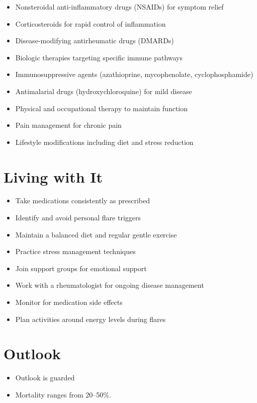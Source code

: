 \begin{itemize}[noitemsep]
  \item Nonsteroidal anti-inflammatory drugs (NSAIDs) for symptom relief
  \item Corticosteroids for rapid control of inflammation
  \item Disease-modifying antirheumatic drugs (DMARDs)
  \item Biologic therapies targeting specific immune pathways
  \item Immunosuppressive agents (azathioprine, mycophenolate, cyclophosphamide)
  \item Antimalarial drugs (hydroxychloroquine) for mild disease
  \item Physical and occupational therapy to maintain function
  \item Pain management for chronic pain
  \item Lifestyle modifications including diet and stress reduction
\end{itemize}
\section{Living with It}
\begin{itemize}[noitemsep]
  \item Take medications consistently as prescribed
  \item Identify and avoid personal flare triggers
  \item Maintain a balanced diet and regular gentle exercise
  \item Practice stress management techniques
  \item Join support groups for emotional support
  \item Work with a rheumatologist for ongoing disease management
  \item Monitor for medication side effects
  \item Plan activities around energy levels during flares
\end{itemize}
\section{Outlook}
\begin{itemize}[noitemsep]
  \item Outlook is guarded
  \item Mortality ranges from 20--50\%.
\end{itemize}
